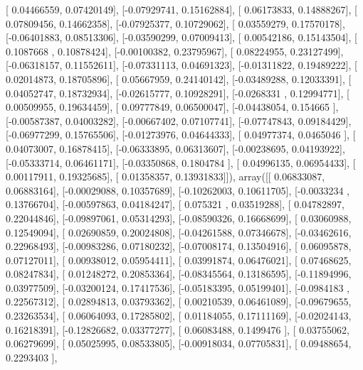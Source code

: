 \documentclass{article}
\begin{document}
       [ 0.04466559,  0.07420149],
       [-0.07929741,  0.15162884],
       [ 0.06173833,  0.14888267],
       [ 0.07809456,  0.14662358],
       [-0.07925377,  0.10729062],
       [ 0.03559279,  0.17570178],
       [-0.06401883,  0.08513306],
       [-0.03590299,  0.07009413],
       [ 0.00542186,  0.15143504],
       [ 0.1087668 ,  0.10878424],
       [-0.00100382,  0.23795967],
       [ 0.08224955,  0.23127499],
       [-0.06318157,  0.11552611],
       [-0.07331113,  0.04691323],
       [-0.01311822,  0.19489222],
       [ 0.02014873,  0.18705896],
       [ 0.05667959,  0.24140142],
       [-0.03489288,  0.12033391],
       [ 0.04052747,  0.18732934],
       [-0.02615777,  0.10928291],
       [-0.0268331 ,  0.12994771],
       [ 0.00509955,  0.19634459],
       [ 0.09777849,  0.06500047],
       [-0.04438054,  0.154665  ],
       [-0.00587387,  0.04003282],
       [-0.00667402,  0.07107741],
       [-0.07747843,  0.09184429],
       [-0.06977299,  0.15765506],
       [-0.01273976,  0.04644333],
       [ 0.04977374,  0.0465046 ],
       [ 0.04073007,  0.16878415],
       [-0.06333895,  0.06313607],
       [-0.00238695,  0.04193922],
       [-0.05333714,  0.06461171],
       [-0.03350868,  0.1804784 ],
       [ 0.04996135,  0.06954433],
       [ 0.00117911,  0.19325685],
       [ 0.01358357,  0.13931833]]), array([[ 0.06833087,  0.06883164],
       [-0.00029088,  0.10357689],
       [-0.10262003,  0.10611705],
       [-0.0033234 ,  0.13766704],
       [-0.00597863,  0.04184247],
       [ 0.075321  ,  0.03519288],
       [ 0.04782897,  0.22044846],
       [-0.09897061,  0.05314293],
       [-0.08590326,  0.16668699],
       [ 0.03060988,  0.12549094],
       [ 0.02690859,  0.20024808],
       [-0.04261588,  0.07346678],
       [-0.03462616,  0.22968493],
       [-0.00983286,  0.07180232],
       [-0.07008174,  0.13504916],
       [ 0.06095878,  0.07127011],
       [ 0.00938012,  0.05954411],
       [ 0.03991874,  0.06476021],
       [ 0.07468625,  0.08247834],
       [ 0.01248272,  0.20853364],
       [-0.08345564,  0.13186595],
       [-0.11894996,  0.03977509],
       [-0.03200124,  0.17417536],
       [-0.05183395,  0.05199401],
       [-0.0984183 ,  0.22567312],
       [ 0.02894813,  0.03793362],
       [ 0.00210539,  0.06461089],
       [-0.09679655,  0.23263534],
       [ 0.06064093,  0.17285802],
       [ 0.01184055,  0.17111169],
       [-0.02024143,  0.16218391],
       [-0.12826682,  0.03377277],
       [ 0.06083488,  0.1499476 ],
       [ 0.03755062,  0.06279699],
       [ 0.05025995,  0.08533805],
       [-0.00918034,  0.07705831],
       [ 0.09488654,  0.2293403 ],
\end{document}
